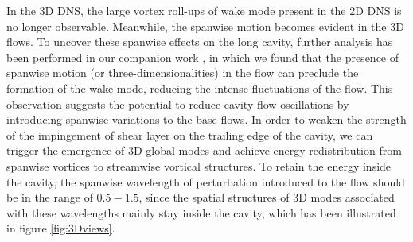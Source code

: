\documentclass{jfm}
\begin{document}
In the 3D DNS, the large vortex roll-ups of wake mode present in the 2D DNS is no longer observable. Meanwhile, the spanwise motion becomes evident in the 3D flows. To uncover these spanwise effects on the long cavity, further analysis has been performed in our companion work \citep{Sun:TCFD16}, in which we found that the presence of spanwise motion (or three-dimensionalities) in the flow can preclude the formation of the wake mode, reducing the intense fluctuations of the flow. This observation suggests the potential to reduce cavity flow oscillations by introducing spanwise variations to the base flows. In order to weaken the strength of the impingement of shear layer on the trailing edge of the cavity, we can trigger the emergence of 3D global modes and achieve energy redistribution from spanwise vortices to streamwise vortical structures. To retain the energy inside the cavity, the spanwise wavelength of perturbation introduced to the flow should be in the range of $0.5-1.5$, since the spatial structures of 3D modes associated with these wavelengths mainly stay inside the cavity, which has been illustrated in figure \ref{fig:3Dviews}.  

%
%
%
\end{document}
